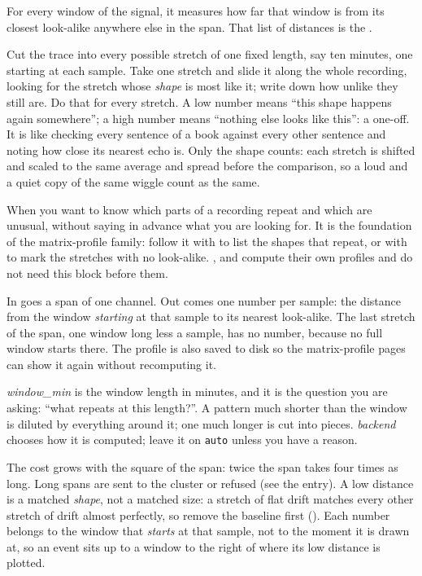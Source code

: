 For every window of the signal, it measures how far that window is from its closest
look-alike anywhere else in the span. That list of distances is the
.

\begin{plainterms}
Cut the trace into every possible stretch of one fixed length, say ten minutes, one starting at
each sample. Take one stretch and slide it along the whole recording, looking for the stretch
whose \emph{shape} is most like it; write down how unlike they still are. Do that for every
stretch. A low number means ``this shape happens again somewhere''; a high number means ``nothing
else looks like this'': a one-off. It is like checking every sentence of a book against every
other sentence and noting how close its nearest echo is. Only the shape counts: each stretch is
shifted and scaled to the same average and spread before the comparison, so a loud and a quiet
copy of the same wiggle count as the same.
\end{plainterms}

When you want to know which parts of a recording repeat and which are unusual, without saying in
advance what you are looking for. It is the foundation of the matrix-profile family: follow it
with  to list the shapes that repeat, or with
 to mark the stretches with no look-alike.
,  and
 compute their own profiles and do not need this block before them.

In goes a span of one channel. Out comes one number per sample: the distance from the window
\emph{starting} at that sample to its nearest look-alike. The last stretch of the span, one window
long less a sample, has no number, because no full window starts there. The profile is also saved
to disk so the matrix-profile pages can show it again without recomputing it.

\emph{window\_min} is the window length in minutes, and it is the question you are asking:
``what repeats at this length?''. A pattern much shorter than the window is diluted by everything
around it; one much longer is cut into pieces. \emph{backend} chooses how it is computed; leave it
on \texttt{auto} unless you have a reason.

The cost grows with the square of the span: twice the span takes four times as long. Long spans
are sent to the cluster or refused (see the entry). A low distance is a matched \emph{shape}, not
a matched size: a stretch of flat drift matches every other stretch of drift almost perfectly, so
remove the baseline first (). Each number belongs to the window
that \emph{starts} at that sample, not to the moment it is drawn at, so an event sits up to a
window to the right of where its low distance is plotted.
